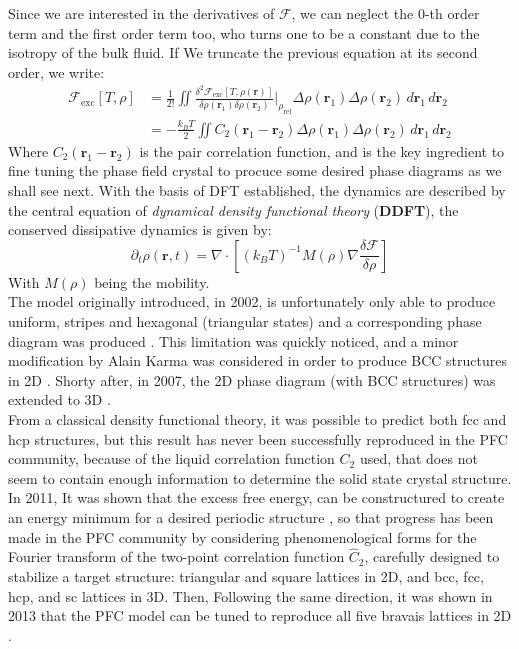 \documentclass[11pt]{article}
\begin{document}
Since we are interested in the derivatives of $\mathcal{F}$, we can neglect the $0$-th order term and the first order term too, who turns one to be a constant due to the isotropy of the bulk fluid. If We truncate the previous equation at its second order, we write:
\begin{equation}
    \begin{aligned}
        \mathcal{F}_{\text{exc}}[T, \rho] &= \frac{1}{2!} \iint \frac{\delta^2 \mathcal{F}_{\text{exc}}[T, \rho(\mathbf{r})]}{\delta \rho(\mathbf{r}_1) \delta \rho(\mathbf{r}_2)} \bigg|_{\rho_{\text{ref}}} \Delta \rho(\mathbf{r}_1)\Delta \rho(\mathbf{r}_2) \, d\mathbf{r}_1 \, d\mathbf{r}_2\\
        &= - \frac{k_B T}{2} \iint C_2(\mathbf{r}_1-\mathbf{r}_2) \Delta \rho(\mathbf{r}_1)\Delta \rho(\mathbf{r}_2) \, d\mathbf{r}_1 \, d\mathbf{r}_2
    \end{aligned}
\end{equation}
Where $C_2(\mathbf{r}_1-\mathbf{r}_2)$ is the pair correlation function, and is the key ingredient to fine tuning the phase field crystal to procuce some desired phase diagrams as we shall see next. With the basis of DFT established, the dynamics are described by the central equation of \emph{dynamical density functional theory} (\textbf{DDFT}), the conserved dissipative dynamics is given by:
\begin{equation}
    \partial_t \rho(\mathbf{r},t) = \nabla \cdot \left[ (k_BT)^{-1}M(\rho) \nabla \frac{\delta \mathcal{F}}{\delta \rho}\right]
\end{equation}
With $M(\rho)$ being the mobility.\\


The model originally introduced, in 2002, is unfortunately only able to produce uniform, stripes and hexagonal (triangular states) and a corresponding phase diagram was produced \parencite{elderModelingelastic2004}. This limitation was quickly noticed, and a minor modification by Alain Karma was considered in order to produce BCC structures in 2D \parencite{wuPhasefieldcrystal2007}. Shorty after, in 2007, the 2D phase diagram (with BCC structures) was extended to 3D \parencite{jaatinenExtendedphase2010}.\\
From a classical density functional theory,  it was possible to predict both fcc and hcp structures, but this result has never been successfully reproduced in the PFC community, because of the liquid correlation function $C_2$ used, that does not seem to contain enough information to determine the solid state crystal structure. In 2011, It was shown that the excess free energy, can be constructured to create an energy minimum for a desired periodic structure \parencite{greenwoodPhasefieldcrystalmethodology2011}, so that progress has been made in the PFC community by considering phenomenological forms for the Fourier transform of the two-point correlation function $\hat C_2$, carefully designed to stabilize a target structure: triangular and square lattices in 2D, and bcc, fcc, hcp, and sc lattices in 3D. Then, Following the same direction, it was shown in 2013 that the PFC model can be tuned to reproduce all five bravais lattices in 2D \parencite{mkhontaExploringComplex2013}.
\end{document}
